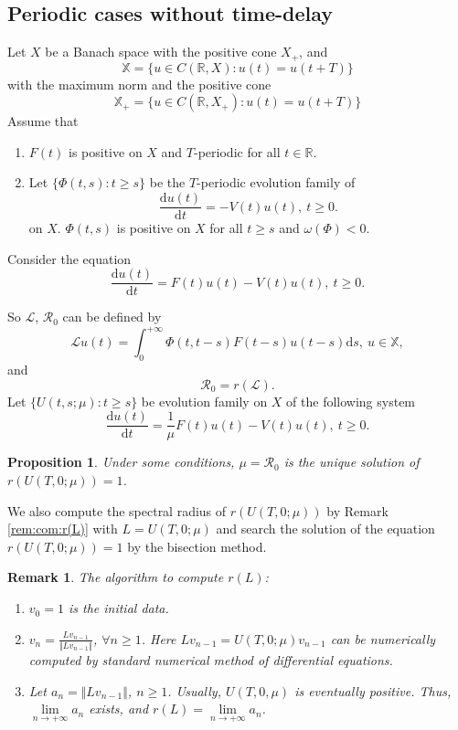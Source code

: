 \documentclass[12pt,reqno]{article}
\newtheorem{proposition}[theorem]{Proposition}
\newtheorem{remark}{Remark}
\newcommand{\D}{\mathrm{d}}
\newcommand{\Real}{\mathbb{R}}
\newcommand{\cL}{\mathcal{L}}
\newcommand{\bX}{\mathbb{X}}
\newcommand{\R}{\mathcal{R}_0}
\begin{document}
\subsection{Periodic cases without time-delay}
Let $X$ be a Banach space with the positive cone $X_+$, and
$$
\bX = \{ u \in C(\Real,X): u (t)= u(t+T)\}
$$
with the maximum norm and the positive cone
$$
\bX_+ = \{ u \in C(\Real,X_+): u (t)= u(t+T)\}
$$
Assume that
\begin{enumerate}[(H1)]
	\item $F(t)$ is positive on $X$ and $T$-periodic for all $t \in \Real$.
	\item Let $\{ \Phi(t,s): t \geq s \} $ be the $T$-periodic evolution family of
	\begin{equation}\label{equ:periodic:internal}
	\frac{\D u(t)}{\D t} = - V(t) u(t),~ t\geq 0.
	\end{equation}
	on $X$.	$\Phi(t,s)$ is positive on $X$ for all $t \geq s$ and $\omega(\Phi)<0$.
\end{enumerate}

Consider the equation
\begin{equation}\label{equ:periodic}
\frac{\D u(t)}{\D t} = F(t) u(t) - V(t) u(t),~ t\geq 0.
\end{equation}



So $\cL$, $\R$ can be defined by
\begin{equation}
\cL u (t) =\int_0^{+\infty}\Phi(t,t-s) F(t-s) u(t-s) \D s,~u \in \bX,
\end{equation}
and
$$\R= r(\cL).
$$
Let $\{ U(t,s;\mu): t\geq s \}$ be evolution family on $X$ of the following system
\begin{equation}\label{equ:periodic:mu}
\frac{\D u(t)}{\D t} = \frac{1}{\mu} F(t) u(t) - V(t) u(t),~ t\geq 0.
\end{equation}
\begin{proposition}\label{prop:th:solution}
	Under some conditions, $\mu = \R$ is the unique solution of $r(U(T,0;\mu))=1$.
\end{proposition}
 We also compute the spectral radius of $r(U(T,0;\mu))$ by Remark \ref{rem:com:r(L)} with $L= U(T,0;\mu)$ and search the solution of the equation $r(U(T,0;\mu))=1$ by the bisection method.

\begin{remark}\label{rem:com:r(U)}
	The algorithm to compute $r(L)$:
	\begin{enumerate}
		\item $v_0=1$ is the initial data.
		\item $v_n = \frac{L v_{n-1}}{\Vert L v_{n-1} \Vert }$, $\forall n \geq 1$. Here $L v_{n-1}=U(T,0;\mu) v_{n-1}$ can be numerically computed by standard numerical method of differential equations.
		\item Let $a_n =\Vert L v_{n-1} \Vert $, $n\geq 1$. Usually, $U(T,0,\mu)$ is eventually positive. Thus, $\lim\limits_{ n\rightarrow +\infty} a_n$ exists, and $r(L)=\lim\limits_{ n\rightarrow +\infty} a_n$.
	\end{enumerate}
\end{remark}
\end{document}
